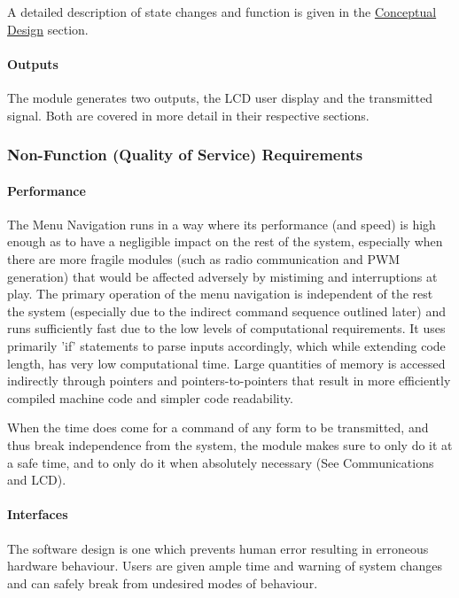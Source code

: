 \documentclass{article}
\begin{document}
	A detailed description of state changes and function is given in the \underline{Conceptual Design} section.
	
	
	\paragraph{Outputs}
	
	The module generates two outputs, the LCD user display and the transmitted signal. Both are covered in more detail in their respective sections.

	
	\subsubsection{Non-Function (Quality of Service) Requirements}

	\paragraph{Performance}
	
	The Menu Navigation runs in a way where its performance (and speed) is high enough as to have a negligible impact on the rest of the system, especially when there are more fragile modules (such as radio communication and PWM generation) that would be affected adversely by mistiming and interruptions at play. The primary operation of the menu navigation is independent of the rest the system (especially due to the indirect command sequence outlined later) and runs sufficiently fast due to the low levels of computational requirements. It uses primarily 'if' statements to parse inputs accordingly, which while extending code length, has very low computational time. Large quantities of memory is accessed indirectly through pointers and pointers-to-pointers that result in more efficiently compiled machine code and simpler code readability.
	
	When the time does come for a command of any form to be transmitted, and thus break independence from the system, the module makes sure to only do it at a safe time, and to only do it when absolutely necessary (See Communications and LCD).

	\paragraph{Interfaces}
	
	The software design is one which prevents human error resulting in erroneous hardware behaviour. Users are given ample time and warning of system changes and can safely break from undesired modes of behaviour.\\
	
\end{document}
